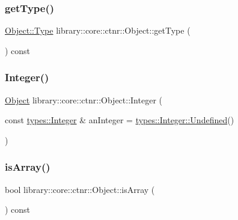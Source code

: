 \mbox{\label{classlibrary_1_1core_1_1ctnr_1_1_object_aa2cc92ae24eb576e0f06af4dce8b7151}} 
\subsubsection{\texorpdfstring{getType()}{getType()}}
{\footnotesize\ttfamily \mbox{\hyperlink{classlibrary_1_1core_1_1ctnr_1_1_object_a0766006ad111133d70349019551b31d6}{Object\+::\+Type}} library\+::core\+::ctnr\+::\+Object\+::get\+Type (\begin{DoxyParamCaption}{ }\end{DoxyParamCaption}) const}

\mbox{\label{classlibrary_1_1core_1_1ctnr_1_1_object_a8a8b1ef718d092c154011cf5c37373bb}} 
\subsubsection{\texorpdfstring{Integer()}{Integer()}}
{\footnotesize\ttfamily \mbox{\hyperlink{classlibrary_1_1core_1_1ctnr_1_1_object}{Object}} library\+::core\+::ctnr\+::\+Object\+::\+Integer (\begin{DoxyParamCaption}\item[{const \mbox{\hyperlink{classlibrary_1_1core_1_1types_1_1_integer}{types\+::\+Integer}} \&}]{an\+Integer = {\ttfamily \mbox{\hyperlink{classlibrary_1_1core_1_1types_1_1_integer_a142c2df49031b787daf30673c73fcad7}{types\+::\+Integer\+::\+Undefined}}()} }\end{DoxyParamCaption})\hspace{0.3cm}{\ttfamily [static]}}

\mbox{\label{classlibrary_1_1core_1_1ctnr_1_1_object_ab400e2c5b6516a9e69b3d0a7ac2178c5}} 
\subsubsection{\texorpdfstring{isArray()}{isArray()}}
{\footnotesize\ttfamily bool library\+::core\+::ctnr\+::\+Object\+::is\+Array (\begin{DoxyParamCaption}{ }\end{DoxyParamCaption}) const}

